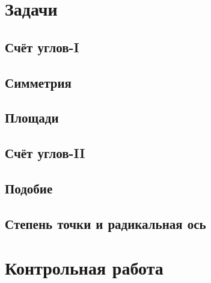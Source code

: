 \documentclass[twoside]{article}
\begin{document}
\newpage
\renewcommand{\thesubsection}{\roman{subsection}}
\setcounter{subsection}{0}

\section*{Задачи}
\subsection{Счёт углов-I}

\subsection{Симметрия}  %
% 
\subsection{Площади}

\subsection{Счёт углов-II}


\subsection{Подобие}    %
% 
\subsection{Степень точки и радикальная ось}    %


\newpage
{}
\section*{Контрольная работа}
% 
\end{document}
